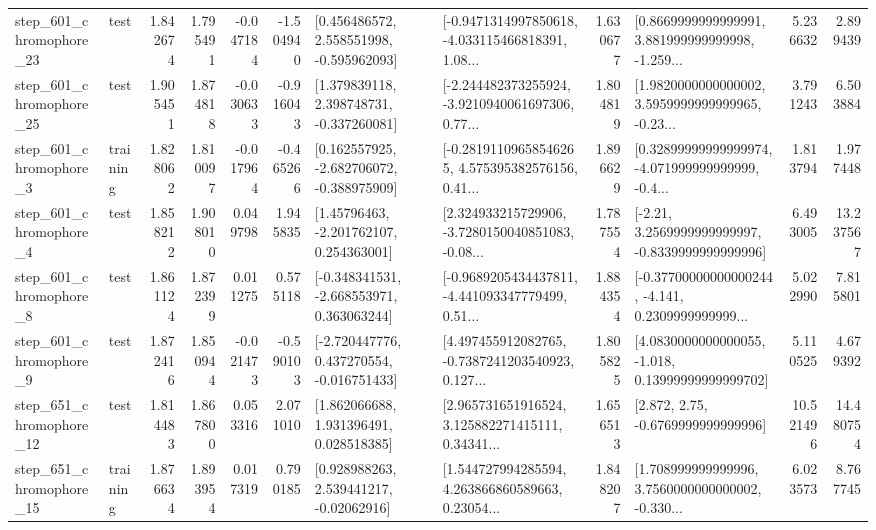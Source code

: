 \begin{tabular}{llrrrrllrlrr}
  step\_601\_chromophore\_23 &      test &      1.842674 &    1.795491 &     -0.047184 & -1.504940 &    [0.456486572, 2.558551998, -0.595962093] &  [-0.9471314997850618, -4.033115466818391, 1.08... &       1.630677 &  [0.8669999999999991, 3.881999999999998, -1.259... &            5.236632 &          2.899439 \\
  step\_601\_chromophore\_25 &      test &      1.905451 &    1.874818 &     -0.030633 & -0.916043 &    [1.379839118, 2.398748731, -0.337260081] &  [-2.244482373255924, -3.9210940061697306, 0.77... &       1.804819 &  [1.9820000000000002, 3.5959999999999965, -0.23... &            3.791243 &          6.503884 \\
   step\_601\_chromophore\_3 &  training &      1.828062 &    1.810097 &     -0.017964 & -0.465266 &   [0.162557925, -2.682706072, -0.388975909] &  [-0.28191109658546265, 4.575395382576156, 0.41... &       1.896629 &  [0.32899999999999974, -4.071999999999999, -0.4... &            1.813794 &          1.977448 \\
   step\_601\_chromophore\_4 &      test &      1.858212 &    1.908010 &      0.049798 &  1.945835 &     [1.45796463, -2.201762107, 0.254363001] &  [2.324933215729906, -3.7280150040851083, -0.08... &       1.787554 &   [-2.21, 3.2569999999999997, -0.8339999999999996] &            6.493005 &         13.237567 \\
   step\_601\_chromophore\_8 &      test &      1.861124 &    1.872399 &      0.011275 &  0.575118 &   [-0.348341531, -2.668553971, 0.363063244] &  [-0.9689205434437811, -4.441093347779499, 0.51... &       1.884354 &  [-0.37700000000000244, -4.141, 0.2309999999999... &            5.022990 &          7.815801 \\
   step\_601\_chromophore\_9 &      test &      1.872416 &    1.850944 &     -0.021473 & -0.590103 &   [-2.720447776, 0.437270554, -0.016751433] &  [4.497455912082765, -0.7387241203540923, 0.127... &       1.805825 &  [4.0830000000000055, -1.018, 0.13999999999999702] &            5.110525 &          4.679392 \\
  step\_651\_chromophore\_12 &      test &      1.814483 &    1.867800 &      0.053316 &  2.071010 &     [1.862066688, 1.931396491, 0.028518385] &  [2.965731651916524, 3.125882271415111, 0.34341... &       1.656513 &                 [2.872, 2.75, -0.6769999999999996] &           10.521496 &         14.480754 \\
  step\_651\_chromophore\_15 &  training &      1.876634 &    1.893954 &      0.017319 &  0.790185 &     [0.928988263, 2.539441217, -0.02062916] &  [1.544727994285594, 4.263866860589663, 0.23054... &       1.848207 &  [1.708999999999996, 3.7560000000000002, -0.330... &            6.023573 &          8.767745 \\

\end{tabular}
